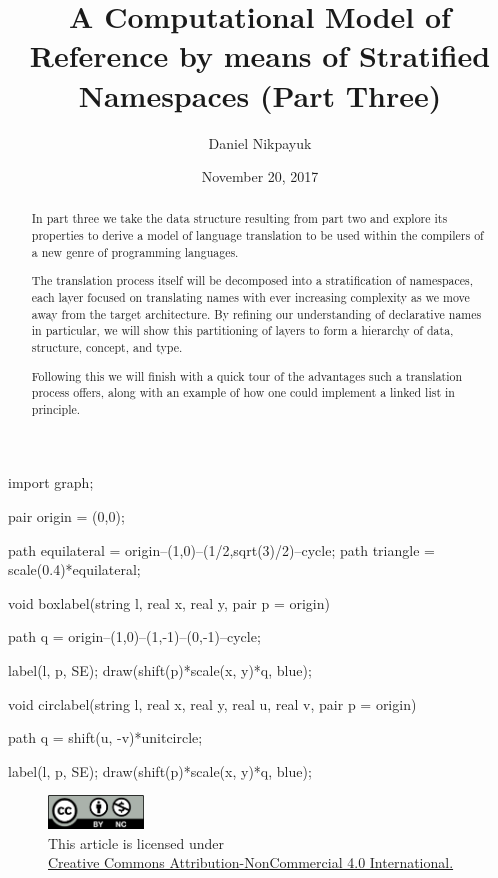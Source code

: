 \documentclass[twoside]{article}
\title{A Computational Model of Reference by means of Stratified Namespaces (Part Three)}
\author{Daniel Nikpayuk}
\date{November 20, 2017}
\begin{document}
\maketitle
\thispagestyle{empty}

\begin{asydef}
import graph;

pair origin = (0,0);

path equilateral = origin--(1,0)--(1/2,sqrt(3)/2)--cycle;
path triangle = scale(0.4)*equilateral;

void boxlabel(string l, real x, real y, pair p = origin)
{
	path q = origin--(1,0)--(1,-1)--(0,-1)--cycle;

	label(l, p, SE);
	draw(shift(p)*scale(x, y)*q, blue);
}

void circlabel(string l, real x, real y, real u, real v, pair p = origin)
{
	path q = shift(u, -v)*unitcircle;

	label(l, p, SE);
	draw(shift(p)*scale(x, y)*q, blue);
}

\end{asydef}

\begin{figure}[h]
\centering
\includegraphics[width=1in]{cc-by-nc.png}\\[0.1in]
\tiny This article is licensed under \\
\href{http://creativecommons.org/licenses/by-nc/4.0/}
{Creative Commons Attribution-NonCommercial 4.0 International.}\\[0.3in]
\end{figure}

\begin{abstract}
In part three we take the data structure resulting from part two and explore its properties to derive
a model of language translation to be used within the compilers of a new genre of programming languages.

The translation process itself will be decomposed into a stratification of namespaces, each layer
focused on translating names with ever increasing complexity as we move away from the target architecture.
By refining our understanding of declarative names in particular, we will show this partitioning of layers
to form a hierarchy of data, structure, concept, and type.

Following this we will finish with a quick tour of the advantages such a translation process offers,
along with an example of how one could implement a linked list in principle.
\end{abstract}
\end{document}
